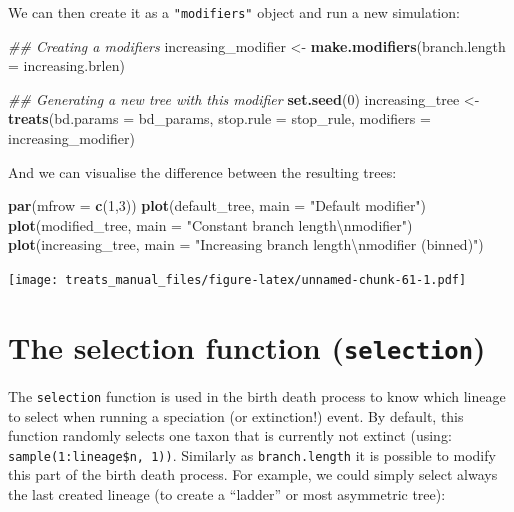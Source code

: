 \documentclass[
]{book}
\newenvironment{Shaded}{\begin{snugshade}}{\end{snugshade}}
\newcommand{\CharTok}[1]{\textcolor[rgb]{0.31,0.60,0.02}{#1}}
\newcommand{\CommentTok}[1]{\textcolor[rgb]{0.56,0.35,0.01}{\textit{#1}}}
\newcommand{\DataTypeTok}[1]{\textcolor[rgb]{0.13,0.29,0.53}{#1}}
\newcommand{\DecValTok}[1]{\textcolor[rgb]{0.00,0.00,0.81}{#1}}
\newcommand{\KeywordTok}[1]{\textcolor[rgb]{0.13,0.29,0.53}{\textbf{#1}}}
\newcommand{\NormalTok}[1]{#1}
\newcommand{\StringTok}[1]{\textcolor[rgb]{0.31,0.60,0.02}{#1}}
\begin{document}
We can then create it as a \texttt{"modifiers"} object and run a new simulation:

\begin{Shaded}
\begin{Highlighting}[]
\CommentTok{\#\# Creating a modifiers}
\NormalTok{increasing\_modifier \textless{}{-}}\StringTok{ }\KeywordTok{make.modifiers}\NormalTok{(}\DataTypeTok{branch.length =}\NormalTok{ increasing.brlen)}

\CommentTok{\#\# Generating a new tree with this modifier}
\KeywordTok{set.seed}\NormalTok{(}\DecValTok{0}\NormalTok{)}
\NormalTok{increasing\_tree \textless{}{-}}\StringTok{ }\KeywordTok{treats}\NormalTok{(}\DataTypeTok{bd.params =}\NormalTok{ bd\_params,}
                        \DataTypeTok{stop.rule =}\NormalTok{ stop\_rule,}
                        \DataTypeTok{modifiers =}\NormalTok{ increasing\_modifier)}
\end{Highlighting}
\end{Shaded}

And we can visualise the difference between the resulting trees:

\begin{Shaded}
\begin{Highlighting}[]
\KeywordTok{par}\NormalTok{(}\DataTypeTok{mfrow =} \KeywordTok{c}\NormalTok{(}\DecValTok{1}\NormalTok{,}\DecValTok{3}\NormalTok{))}
\KeywordTok{plot}\NormalTok{(default\_tree,    }\DataTypeTok{main =} \StringTok{"Default modifier"}\NormalTok{)}
\KeywordTok{plot}\NormalTok{(modified\_tree,   }\DataTypeTok{main =} \StringTok{"Constant branch length}\CharTok{\textbackslash{}n}\StringTok{modifier"}\NormalTok{)}
\KeywordTok{plot}\NormalTok{(increasing\_tree, }\DataTypeTok{main =} \StringTok{"Increasing branch length}\CharTok{\textbackslash{}n}\StringTok{modifier (binned)"}\NormalTok{)}
\end{Highlighting}
\end{Shaded}

\texttt{[image: treats\_manual\_files/figure-latex/unnamed-chunk-61-1.pdf]}

\hypertarget{the-selection-function-selection}{%
\section{\texorpdfstring{The selection function (\texttt{selection})}{The selection function (selection)}}\label{the-selection-function-selection}}

The \texttt{selection} function is used in the birth death process to know which lineage to select when running a speciation (or extinction!) event.
By default, this function randomly selects one taxon that is currently not extinct (using: \texttt{sample(1:lineage\$n,\ 1))}.
Similarly as \texttt{branch.length} it is possible to modify this part of the birth death process.
For example, we could simply select always the last created lineage (to create a ``ladder'' or most asymmetric tree):
\end{document}
